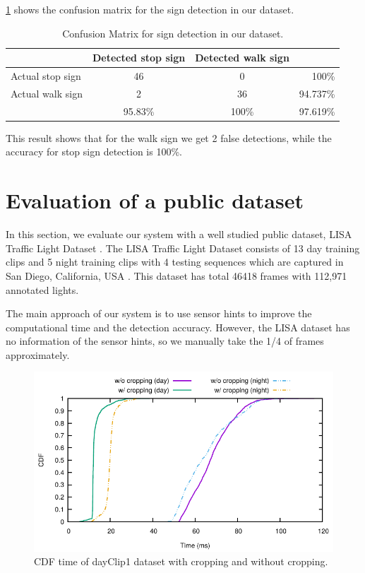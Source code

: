 \ref{t:walk_sign} shows the confusion matrix for the sign detection in our dataset.

\begin{table}[h!]
  \centering
 
  \begin{tabular}{  l  c  c  r }
    \rowcolor{gray!50}
     & Detected stop sign & Detected walk sign &  \\
    \hline
    Actual stop sign & 46 & 0 & 100\% \\
    Actual walk sign & 2 & 36 & 94.737\% \\
    \hline
    & 95.83\% & 100\% & 97.619\% \\
    
  \end{tabular}
  \caption{Confusion Matrix for sign detection in our dataset.}
  \label{t:walk_sign}
\end{table}

This result shows that for the walk sign we get 2 false detections, while the accuracy for stop sign detection is 100\%.


\section{Evaluation of a public dataset}

In this section, we evaluate our system with a well studied public dataset, LISA Traffic Light Dataset \cite{lisa}.
The LISA Traffic Light Dataset consists of 13 day training clips and 5 night training clips with 4 testing sequences which are captured in San Diego, California, USA \cite{lisa2}.
This dataset has total 46418 frames with 112,971 annotated lights.

The main approach of our system is to use sensor hints to improve the computational time and the detection accuracy.
However, the LISA dataset has no information of the sensor hints, so we manually take the 1/4 of frames approximately.


\begin{figure}[ht!]
  \centering
  \includegraphics[width=5.2in]{plots/lisacdf.pdf}
  \caption{CDF time of dayClip1 dataset with cropping and without cropping.}
  \label{f:lisa_cdf}
\end{figure}

